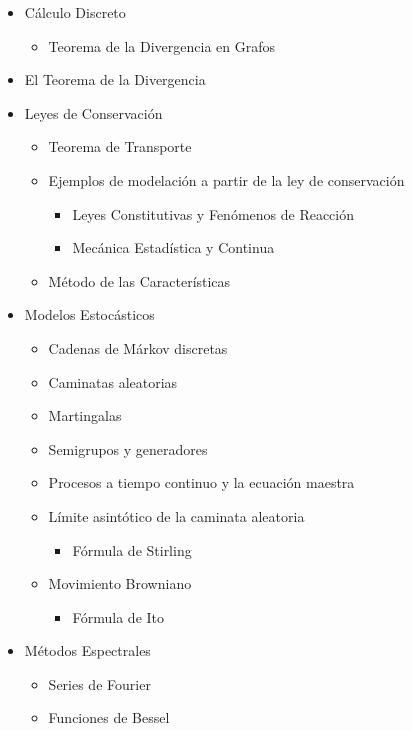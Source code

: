 \documentclass[10pt,a4paper]{article}
\begin{document}
\begin{itemize}
    \item Cálculo Discreto
    \begin{itemize}
    	\item Teorema de la Divergencia en Grafos
    \end{itemize}
    \item El Teorema de la Divergencia
    \item Leyes de Conservación
    \begin{itemize}
        \item Teorema de Transporte
        \item Ejemplos de modelación a partir de la ley de conservación
        \begin{itemize}
            \item Leyes Constitutivas y Fenómenos de Reacción
            \item Mecánica Estadística y Continua
        \end{itemize}
        \item Método de las Características
    \end{itemize}
    \item Modelos Estocásticos
    \begin{itemize}
        \item Cadenas de Márkov discretas
        \item Caminatas aleatorias
        \item Martingalas
        \item Semigrupos y generadores
    	\item Procesos a tiempo continuo y la ecuación maestra
    	\item Límite asintótico de la caminata aleatoria
    	\begin{itemize}
        	\item Fórmula de Stirling
    	\end{itemize}
    	\item Movimiento Browniano
   	 	\begin{itemize}
       		\item Fórmula de Ito
    	\end{itemize}
    \end{itemize}
    \item Métodos Espectrales
    \begin{itemize}
        \item Series de Fourier
        \item Funciones de Bessel

\end{itemize}
\end{itemize}
\end{document}

